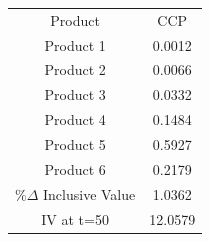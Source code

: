 \begin{tabular}{cc}
Product & CCP \\
Product 1 & 0.0012 \\
Product 2 & 0.0066 \\
Product 3 & 0.0332 \\
Product 4 & 0.1484 \\
Product 5 & 0.5927 \\
Product 6 & 0.2179 \\
$\%\Delta$ Inclusive Value & 1.0362 \\
IV at t=50 & 12.0579 \\
\end{tabular}